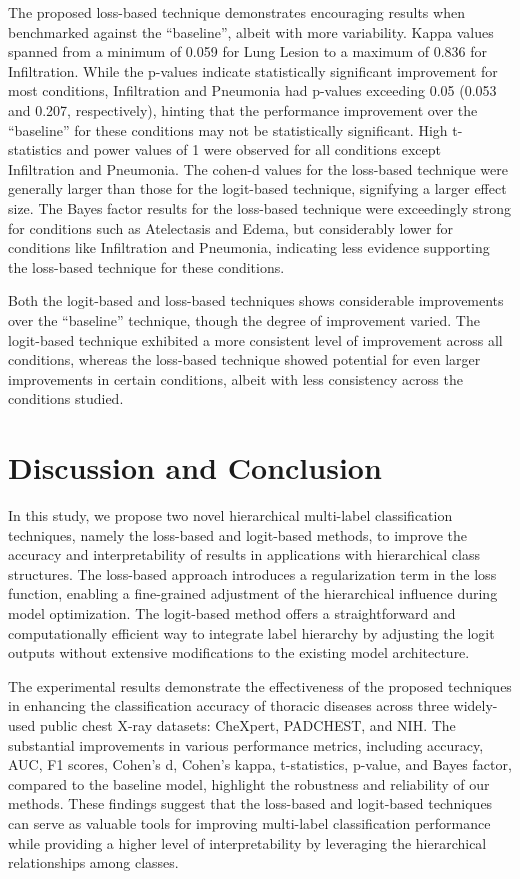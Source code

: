 \documentclass[review,1p,times,numbers]{elsarticle}
\begin{document}
The proposed loss-based technique demonstrates encouraging results when benchmarked against the ``baseline'', albeit with more variability. Kappa values spanned from a minimum of 0.059 for Lung Lesion to a maximum of 0.836 for Infiltration. While the p-values indicate statistically significant improvement for most conditions, Infiltration and Pneumonia had p-values exceeding 0.05 (0.053 and 0.207, respectively), hinting that the performance improvement over the ``baseline'' for these conditions may not be statistically significant. High t-statistics and power values of 1 were observed for all conditions except Infiltration and Pneumonia. The cohen-d values for the loss-based technique were generally larger than those for the logit-based technique, signifying a larger effect size. The Bayes factor results for the loss-based technique were exceedingly strong for conditions such as Atelectasis and Edema, but considerably lower for conditions like Infiltration and Pneumonia, indicating less evidence supporting the loss-based technique for these conditions.

Both the logit-based and loss-based techniques shows considerable improvements over the ``baseline'' technique, though the degree of improvement varied. The logit-based technique exhibited a more consistent level of improvement across all conditions, whereas the loss-based technique showed potential for even larger improvements in certain conditions, albeit with less consistency across the conditions studied.
\section{Discussion and Conclusion}\label{sec:taxonomy.discussion}
In this study, we propose two novel hierarchical multi-label classification techniques, namely the loss-based and logit-based methods, to improve the accuracy and interpretability of results in applications with hierarchical class structures. The loss-based approach introduces a regularization term in the loss function, enabling a fine-grained adjustment of the hierarchical influence during model optimization. The logit-based method offers a straightforward and computationally efficient way to integrate label hierarchy by adjusting the logit outputs without extensive modifications to the existing model architecture.

The experimental results demonstrate the effectiveness of the proposed techniques in enhancing the classification accuracy of thoracic diseases across three widely-used public chest X-ray datasets: CheXpert, PADCHEST, and NIH. The substantial improvements in various performance metrics, including accuracy, AUC, F1 scores, Cohen's d, Cohen's kappa, t-statistics, p-value, and Bayes factor, compared to the baseline model, highlight the robustness and reliability of our methods. These findings suggest that the loss-based and logit-based techniques can serve as valuable tools for improving multi-label classification performance while providing a higher level of interpretability by leveraging the hierarchical relationships among classes.
\end{document}
